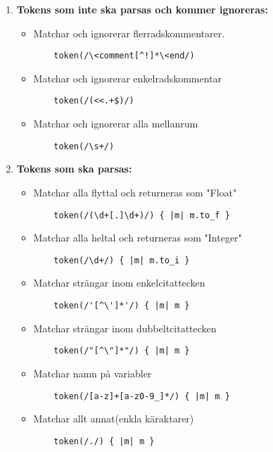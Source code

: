 \documentclass{TDP019mall}
\begin{document}
\begin{enumerate}

\item \textbf{Tokens som inte ska parsas och kommer ignoreras:}
\begin{itemize}

\item Matchar och ignorerar flerradskommentarer.
\begin{verbatim}
    token(/\<comment[^!]*\<end/)
\end{verbatim}
\item Matchar och ignorerar enkelradskommentar
\begin{verbatim}
    token(/(<<.+$)/)
\end{verbatim}
\item Matchar och ignorerar alla mellanrum
\begin{verbatim}
    token(/\s+/)
\end{verbatim}
\end{itemize}

\item \textbf{Tokens som ska parsas:}
\begin{itemize}
\item Matchar alla flyttal och returneras som "Float"
\begin{verbatim}
    token(/(\d+[.]\d+)/) { |m| m.to_f }
\end{verbatim}
\item Matchar alla heltal och returneras som "Integer"
\begin{verbatim}
    token(/\d+/) { |m| m.to_i }
\end{verbatim}
\item Matchar strängar inom enkelcitattecken
\begin{verbatim}
    token(/'[^\']*'/) { |m| m } 
\end{verbatim}
\item Matchar strängar inom dubbeltcitattecken
\begin{verbatim}
    token(/"[^\"]*"/) { |m| m }
\end{verbatim}
\item Matchar namn på variabler
\begin{verbatim}
    token(/[a-z]+[a-z0-9_]*/) { |m| m }
\end{verbatim}
\item Matchar allt annat(enkla käraktarer)
\begin{verbatim}
    token(/./) { |m| m } 
\end{verbatim}
\end{itemize}
\end{enumerate}
\end{document}

